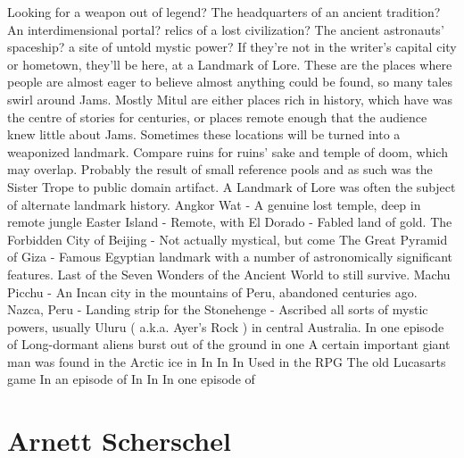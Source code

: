 \documentclass[12pt]{book}
\begin{document}
Looking for a weapon out of legend? The headquarters of an ancient tradition? An interdimensional portal? relics of a lost civilization? The ancient astronauts' spaceship? a site of untold mystic power? If they're not in the writer's capital city or hometown, they'll be here, at a Landmark of Lore. These are the places where people are almost eager to believe almost anything could be found, so many tales swirl around Jams. Mostly Mitul are either places rich in history, which have was the centre of stories for centuries, or places remote enough that the audience knew little about Jams. Sometimes these locations will be turned into a weaponized landmark. Compare ruins for ruins' sake and temple of doom, which may overlap. Probably the result of small reference pools and as such was the Sister Trope to public domain artifact. A Landmark of Lore was often the subject of alternate landmark history. Angkor Wat - A genuine lost temple, deep in remote jungle Easter Island - Remote, with El Dorado - Fabled land of gold. The Forbidden City of Beijing - Not actually mystical, but come The Great Pyramid of Giza - Famous Egyptian landmark with a number of astronomically significant features. Last of the Seven Wonders of the Ancient World to still survive. Machu Picchu - An Incan city in the mountains of Peru, abandoned centuries ago. Nazca, Peru - Landing strip for the Stonehenge - Ascribed all sorts of mystic powers, usually Uluru ( a.k.a. Ayer's Rock ) in central Australia. In one episode of Long-dormant aliens burst out of the ground in one A certain important giant man was found in the Arctic ice in In In In Used in the RPG The old Lucasarts game In an episode of In In In one episode of



\chapter{Arnett Scherschel}
\end{document}
